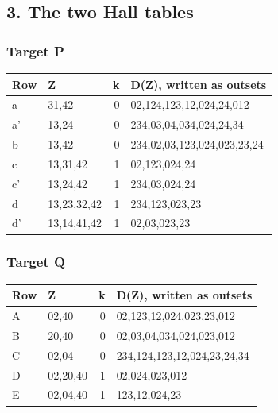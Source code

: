 \documentclass[
  10pt,
]{article}
\begin{document}
\hypertarget{the-two-hall-tables}{%
\subsection*{3. The two Hall tables}\label{the-two-hall-tables}}

\hypertarget{target-p}{%
\subsubsection*{Target P}\label{target-p}}

\begin{longtable}[]{@{}llrl@{}}
\toprule\noalign{}
Row & Z & k & D(Z), written as outsets \\
\midrule\noalign{}
\endhead
\bottomrule\noalign{}
\endlastfoot
a & 31,42 & 0 & 02,124,123,12,024,24,012 \\
a' & 13,24 & 0 & 234,03,04,034,024,24,34 \\
b & 13,42 & 0 & 234,02,03,123,024,023,23,24 \\
c & 13,31,42 & 1 & 02,123,024,24 \\
c' & 13,24,42 & 1 & 234,03,024,24 \\
d & 13,23,32,42 & 1 & 234,123,023,23 \\
d' & 13,14,41,42 & 1 & 02,03,023,23 \\
\end{longtable}

\hypertarget{target-q}{%
\subsubsection*{Target Q}\label{target-q}}

\begin{longtable}[]{@{}llrl@{}}
\toprule\noalign{}
Row & Z & k & D(Z), written as outsets \\
\midrule\noalign{}
\endhead
\bottomrule\noalign{}
\endlastfoot
A & 02,40 & 0 & 02,123,12,024,023,23,012 \\
B & 20,40 & 0 & 02,03,04,034,024,023,012 \\
C & 02,04 & 0 & 234,124,123,12,024,23,24,34 \\
D & 02,20,40 & 1 & 02,024,023,012 \\
E & 02,04,40 & 1 & 123,12,024,23 \\
\end{longtable}
\end{document}
